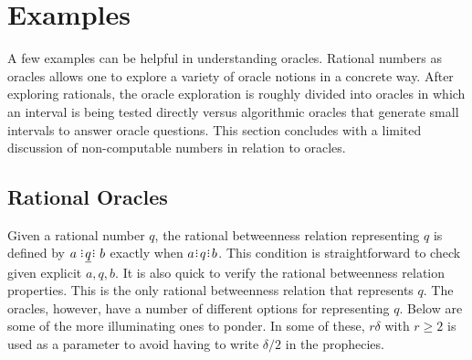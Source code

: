 \documentclass[12pt]{article}
\begin{document}
\section{Examples}

A few examples can be helpful in understanding oracles. Rational numbers as oracles allows one to explore a variety of oracle notions in a concrete way. After exploring rationals, the oracle exploration is roughly divided into oracles in which an interval is being tested directly versus algorithmic oracles that generate small intervals to answer oracle questions. This section concludes with a limited discussion of non-computable numbers in relation to oracles. 

\subsection{Rational Oracles}

Given a rational number $q$, the rational betweenness relation representing $q$ is defined by $a \xrel[q] b$ exactly when $a \rint q \rint b$. This condition is straightforward to check given explicit $a, q, b$. It is also quick to verify the rational betweenness relation properties. This is the only rational betweenness relation that represents $q$. The oracles, however, have a number of different options for representing $q$. Below are some of the more illuminating ones to ponder. In some of these, $r \delta$ with $r \geq 2$ is used as a parameter to avoid having to write $\delta/2$ in the prophecies. 
\end{document}
